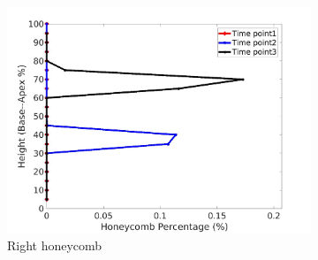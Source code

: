 \begin{figure}[H]
\begin{subfigure}{.42\linewidth}
  \includegraphics[width=\linewidth,trim={{.0\wd0} {.0\wd0} {.0\wd0} {.0\wd0}},clip]{Appendix/Image_AppexA/BaseToApex/IPF5RightLungHoneycombDiseaseAgainstHeight.jpg}
  \caption{Right honeycomb}
  \label{fig:IPF5DiseaseAgainstHeight-f}
\end{subfigure}
\begin{subfigure}{.42\linewidth}%

\end{subfigure}
\end{figure}

